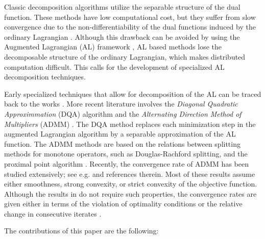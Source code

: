 \documentclass[doublecolumn]{IEEEtran}
\begin{document}
Classic decomposition algorithms utilize the separable structure of the dual function.
These methods have low computational cost, but they suffer from slow convergence due to the non-differentiability of the dual functions induced by the ordinary Lagrangian \cite[Chapter 2.6]{Berts1}.
Although this drawback can be avoided by using the Augmented Lagrangian (AL) framework \cite[Chapter 2.1]{Bert_Constrained},
AL based methods lose the decomposable structure of the ordinary Lagrangian,
which makes distributed computation difficult.
This calls for the development of specialized AL decomposition techniques.

Early specialized techniques that allow for decomposition of the AL can be traced back to the works \cite{Tatjewski,Watanabe,Teboulle}. More recent literature involves the \emph{Diagonal Quadratic Approximmation} (DQA) algorithm  \cite{Mulvey,Rus} and the \emph{Alternating Direction Method of Multipliers} (ADMM) \cite{Eck_DR,Eck_Monotrop,Boyd_ADMM}.
The DQA method replaces each minimization step in the augmented Lagrangian algorithm   by a separable approximation of the AL function. The ADMM methods are based on the relations between splitting methods for monotone operators, such as Douglas-Rachford splitting, and the proximal point algorithm  \cite{Glow,Eck_DR}.
Recently, the convergence rate of ADMM has been studied extensively;
see e.g. \cite{WYin2015} and references therein.
Most of these results assume either smoothness, strong convexity, or
strict convexity of the objective function.
Although the results in \cite{He2012,He2015} do not require such properties, the convergence rates are given either in terms of the violation of optimality conditions \cite{He2012}  or the relative change in consecutive iterates \cite{He2015}.

The contributions of this paper are the following:
\end{document}
